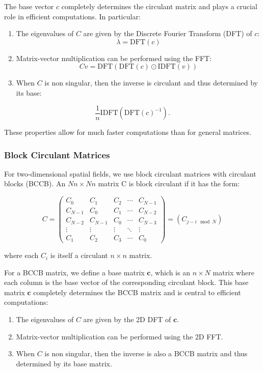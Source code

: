 \documentclass[journal=,manuscript=]{achemso}
\begin{document}
The base vector \(c\) completely determines the circulant matrix and
plays a crucial role in efficient computations. In particular:

\begin{enumerate}
\def\labelenumi{\arabic{enumi}.}
\item
  The eigenvalues of \(C\) are given by the Discrete Fourier Transform
  (DFT) of \(c\): \[
  \lambda = \text{DFT}(c)
  \]
\item
  Matrix-vector multiplication can be performed using the FFT: \[
  Cv = \text{DFT}(\text{DFT}(c) \odot \text{IDFT}(v))
  \]
\item
  When \(C\) is non singular, then the inverse is circulant and thus
  determined by its base:
\end{enumerate}

\[
\frac1n \text{IDFT}(\text{DFT}(c)^{-1}).
\]

These properties allow for much faster computations than for general
matrices.

\subsubsection{Block Circulant Matrices}\label{block-circulant-matrices}

For two-dimensional spatial fields, we use block circulant matrices with
circulant blocks (BCCB). An \(Nn \times Nn\) matrix C is block circulant
if it has the form:

\[
C = \begin{pmatrix}
C_0 & C_1 & C_2 & \cdots & C_{N-1} \\
C_{N-1} & C_0 & C_1 & \cdots & C_{N-2} \\
C_{N-2} & C_{N-1} & C_0 & \cdots & C_{N-3} \\
\vdots & \vdots & \vdots & \ddots & \vdots \\
C_1 & C_2 & C_3 & \cdots & C_0
\end{pmatrix} = (C_{j-i \mod N})
\]

where each \(C_i\) is itself a circulant \(n \times n\) matrix.

For a BCCB matrix, we define a base matrix \(\mathbf c\), which is an
\(n \times N\) matrix where each column is the base vector of the
corresponding circulant block. This base matrix \(\mathbf c\) completely
determines the BCCB matrix and is central to efficient computations:

\begin{enumerate}
\def\labelenumi{\arabic{enumi}.}
\item
  The eigenvalues of \(C\) are given by the 2D DFT of \(\mathbf c\).
\item
  Matrix-vector multiplication can be performed using the 2D FFT.
\item
  When \(C\) is non singular, then the inverse is also a BCCB matrix and
  thus determined by its base matrix.
\end{enumerate}
\end{document}
